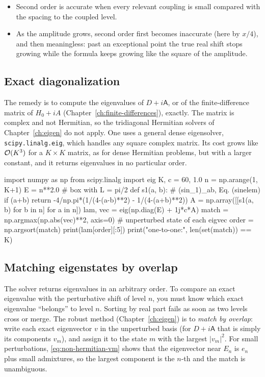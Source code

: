 \begin{itemize}
\item Second order is accurate when every relevant coupling is small compared with the spacing to the coupled level.
\item As the amplitude grows, second order first becomes inaccurate (here by $x/4$), and then meaningless: past an exceptional point the true real shift stops growing while the formula keeps growing like the square of the amplitude.
\end{itemize}

\subsection{Exact diagonalization}

The remedy is to compute the eigenvalues of $D+i\mathsf A$, or of the finite-difference matrix of $H_0+iA$ (Chapter~\ref{ch:finite-differences}), exactly. The matrix is complex and not Hermitian, so the tridiagonal Hermitian solvers of Chapter~\ref{ch:eigen} do not apply. One uses a general dense eigensolver, \texttt{scipy.linalg.eig}, which handles any square complex matrix. Its cost grows like $\mathcal{O}(K^3)$ for a $K\times K$ matrix, as for dense Hermitian problems, but with a larger constant, and it returns eigenvalues in no particular order.

\begin{pycode}
import numpy as np
from scipy.linalg import eig
K, c = 60, 1.0
n = np.arange(1, K+1)
E = n**2.0                                 # box with L = pi/2
def s1(a, b):                              # (sin_1)_{ab}, Eq. (sinelem)
    if (a+b) %
    return -4/np.pi*(1/(4-(a-b)**2) - 1/(4-(a+b)**2))
A = np.array([[s1(a, b) for b in n] for a in n])
lam, vec = eig(np.diag(E) + 1j*c*A)
match = np.argmax(np.abs(vec)**2, axis=0)  # unperturbed state of each eigvec
order = np.argsort(match)
print(lam[order][:5])
print("one-to-one:", len(set(match)) == K)
\end{pycode}

\subsection{Matching eigenstates by overlap}

The solver returns eigenvalues in an arbitrary order. To compare an exact eigenvalue with the perturbative shift of level $n$, you must know which exact eigenvalue ``belongs'' to level $n$. Sorting by real part fails as soon as two levels cross or merge. The robust method (Chapter~\ref{ch:eigen}) is to \emph{match by overlap}: write each exact eigenvector $v$ in the unperturbed basis (for $D+i\mathsf A$ that is simply its components $v_m$), and assign it to the state $m$ with the largest $|v_m|^2$. For small perturbations, \eqref{eq:non-hermitian-vm} shows that the eigenvector near $E_n$ is $e_n$ plus small admixtures, so the largest component is the $n$-th and the match is unambiguous.

